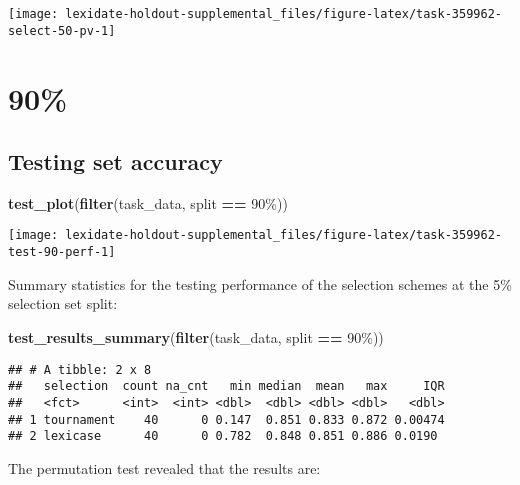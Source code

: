 \documentclass[
]{book}
\newenvironment{Shaded}{\begin{snugshade}}{\end{snugshade}}
\newcommand{\FunctionTok}[1]{\textcolor[rgb]{0.13,0.29,0.53}{\textbf{#1}}}
\newcommand{\NormalTok}[1]{#1}
\newcommand{\SpecialCharTok}[1]{\textcolor[rgb]{0.81,0.36,0.00}{\textbf{#1}}}
\newcommand{\StringTok}[1]{\textcolor[rgb]{0.31,0.60,0.02}{#1}}
\begin{document}
\texttt{[image: lexidate-holdout-supplemental\_files/figure-latex/task-359962-select-50-pv-1]}

\hypertarget{section-58}{%
\section{90\%}\label{section-58}}

\hypertarget{testing-set-accuracy-58}{%
\subsection{Testing set accuracy}\label{testing-set-accuracy-58}}

\begin{Shaded}
\begin{Highlighting}[]
\FunctionTok{test\_plot}\NormalTok{(}\FunctionTok{filter}\NormalTok{(task\_data, split }\SpecialCharTok{==} \StringTok{\textquotesingle{}90\%\textquotesingle{}}\NormalTok{))}
\end{Highlighting}
\end{Shaded}

\texttt{[image: lexidate-holdout-supplemental\_files/figure-latex/task-359962-test-90-perf-1]}

Summary statistics for the testing performance of the selection schemes at the 5\% selection set split:

\begin{Shaded}
\begin{Highlighting}[]
\FunctionTok{test\_results\_summary}\NormalTok{(}\FunctionTok{filter}\NormalTok{(task\_data, split }\SpecialCharTok{==} \StringTok{\textquotesingle{}90\%\textquotesingle{}}\NormalTok{))}
\end{Highlighting}
\end{Shaded}

\begin{verbatim}
## # A tibble: 2 x 8
##   selection  count na_cnt   min median  mean   max     IQR
##   <fct>      <int>  <int> <dbl>  <dbl> <dbl> <dbl>   <dbl>
## 1 tournament    40      0 0.147  0.851 0.833 0.872 0.00474
## 2 lexicase      40      0 0.782  0.848 0.851 0.886 0.0190
\end{verbatim}

The permutation test revealed that the results are:
\end{document}
